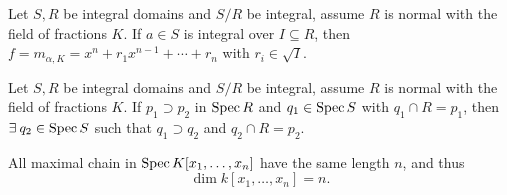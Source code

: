\begin{prop}
  Let $S, R$ be integral domains and $S/R$ be integral, assume $R$ is normal
  with the field of fractions $K$. If $a \in S$ is integral over $I \subseteq R$, then
  $f = m_{\alpha, K} = x^n + r_1 x^{n-1} + \dotsm + r_n$ with $r_i \in \sqrt{I}$.
\end{prop}

\begin{theorem}
  Let $S, R$ be integral domains and $S/R$ be integral, assume $R$ is normal
  with the field of fractions $K$. If $p_1 \supset p_2$ in $\operatorname{Spec} R$ and $q_1 \in \operatorname{Spec} S$
  with $q_1 \cap R = p_1$,
  then $\exists q_2 \in \Spec S$ such that $q_1 \supset q_2$ and $q_2 \cap R = p_2$.
\end{theorem}

\begin{theorem}
  All maximal chain in $\operatorname{Spec} K[x_1, \dots, x_n]$ have the same length $n$, and thus
  \[ \dim k[x_1, \dots, x_n] = n. \]
\end{theorem}
